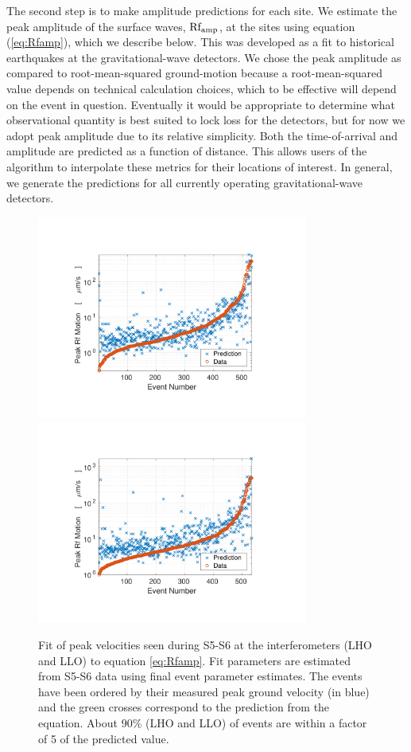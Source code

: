 \documentclass[twocolumn, prl, superscriptaddress]{revtex4}
\begin{document}
The second step is to make amplitude predictions for each site. We estimate the peak amplitude of the surface waves, $\rm Rf_{amp}$, at the sites using equation (\ref{eq:Rfamp}), which we describe below. This was developed as a fit to historical earthquakes at the gravitational-wave detectors. We chose the peak amplitude as compared to root-mean-squared ground-motion because a root-mean-squared value depends on technical calculation choices, which to be effective will depend on the event in question. Eventually it would be appropriate to determine what observational quantity is best suited to lock loss for the detectors, but for now we adopt peak amplitude due to its relative simplicity. Both the time-of-arrival and amplitude are predicted as a function of distance. This allows users of the algorithm to interpolate these metrics for their locations of interest. In general, we generate the predictions for all currently operating gravitational-wave detectors.

\begin{figure}[t]
\hspace*{-0.5cm}
 \includegraphics[width=3.5in,trim = 2.5cm 1.5cm 2.5cm 1.5cm, clip=true]{Prediction_LHO_S5_S6.pdf}
 \includegraphics[width=3.5in,trim = 2.5cm 1.5cm 2.5cm 1.5cm, clip=true]{Prediction_LLO_S5_S6.pdf}
 \caption{Fit of peak velocities seen during S5-S6 at the interferometers (LHO and LLO) to equation \ref{eq:Rfamp}.  Fit parameters are estimated from S5-S6 data using final event parameter estimates. The events have been ordered by their measured peak ground velocity (in blue) and the green crosses correspond to the prediction from the equation. About 90\% (LHO and LLO) of events are within a factor of 5 of the predicted value.}
 \label{fig:regression}
\end{figure}
\end{document}
